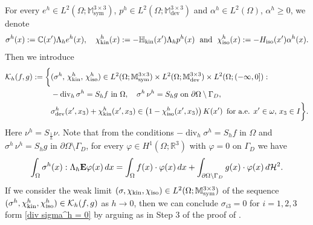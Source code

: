 \documentclass[reqno,10pt]{amsart}
\numberwithin{equation}{section}
\theoremstyle{remark}
\newcommand{\C}{\mathbb{C}}
\newcommand{\calH}{\mathcal{H}}
\newcommand{\calK}{\mathcal{K}}
\newcommand{\M}{\mathbb{M}}
\newcommand{\R}{\mathbb{R}}
\DeclareMathOperator{\dev}{dev}
\DeclareMathOperator{\sym}{sym}
\renewcommand{\div}{\operatorname{div}}
\newcommand{\fvol}{f}
\newcommand{\fsurf}{g}
\newcommand{\Dir}{D}
\newcommand{\scaling}{{S}}
\newcommand{\E}{{\bf E}}
\newcommand{\Hkin}{\mathbb{H}_{\rm kin}}
\newcommand{\Hiso}{H_{\rm iso}}
\newcommand{\chikin}{\chi_{\rm kin}}
\newcommand{\chiiso}{\chi_{\rm iso}}
\begin{document}
For every $e^h \in L^2(\Omega;\M^{3 \times 3}_{\sym})$, $p^h \in L^2(\Omega;\M^{3 \times 3}_{\dev})$ and $\alpha^h \in L^2(\Omega)$, $\alpha^h \geq 0$, we denote 
\begin{equation*}
	\sigma^h(x) := \C(x') \Lambda_h e^h(x),
	\quad \chikin^h(x) := - \Hkin(x') \Lambda_h p^h(x)
	\;\text{ and }\; \chiiso^h(x) := - \Hiso(x') \alpha^h(x).
\end{equation*}
Then we introduce
\begin{align*}
	\calK_{h}(f,g) := \bigg\{& (\sigma^h,\, \chikin^h,\, \chiiso^h) \in L^2(\Omega;\M^{3 \times 3}_{\sym}) \times L^2(\Omega;\M^{3 \times 3}_{\dev}) \times L^2(\Omega;(-\infty,0]) : 
	\\& -\div_{h}\sigma^h = \scaling_h\fvol \text{ in } \Omega,\quad \sigma^h\,\nu^h = \scaling_h\fsurf \text{ on } \partial{\Omega} \setminus {\Gamma_\Dir},
	\\& \sigma^h_{\dev}(x',x_3)+\chikin^h(x',x_3) \in \left(1-\chiiso^h(x',x_3)\right) K(x') \,\text{ for a.e. } x' \in \omega,\, x_3 \in I\bigg\}.
\end{align*}
Here $\nu^h = \scaling_{\frac{1}{h}}\nu$. 
Note that from the conditions 
$-\div_{h}\sigma^h = \scaling_h\fvol \text{ in } \Omega$ and $\sigma^h\,\nu^h = \scaling_h\fsurf \text{ in } \partial{\Omega} \setminus {\Gamma_\Dir}$,
for every $\varphi \in H^1(\Omega;\R^3)$ with $\varphi = 0$ on $\Gamma_\Dir$ we have
\begin{equation} \label{div sigma^h = 0}
	\int_{\Omega} \sigma^h(x) : \Lambda_h {\E}\varphi(x) \,dx 
	= \int_{\Omega} f(x) \cdot \varphi(x) \,dx 
	+ \int_{\partial{\Omega} \setminus {\Gamma_\Dir}} \fsurf(x) \cdot \varphi(x) \,d\calH^{2}.
\end{equation}
If we consider the weak limit $(\sigma, \chikin, \chiiso) \in L^2(\Omega;\M^{3 \times 3}_{\sym})$ of the sequence $(\sigma^h, \chikin^h, \chiiso^h) \in \calK_{h}(f,g)$ as $h \to 0$, then we can conclude $\sigma_{i3} = 0$ for $i=1,2,3$ form \eqref{div sigma^h = 0} by arguing as in Step 3 of the proof of .
\end{document}
